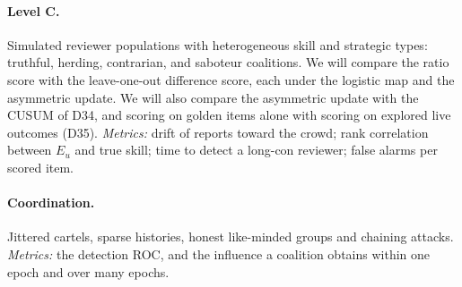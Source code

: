 \paragraph{Level C.}
Simulated reviewer populations with heterogeneous skill and strategic types: truthful, herding,
contrarian, and saboteur coalitions. We will compare the ratio score with the leave-one-out
difference score, each under the logistic map and the asymmetric update.
We will also compare the asymmetric update with the CUSUM of D34, and scoring on golden items
alone with scoring on explored live outcomes (D35).
\emph{Metrics:} drift of reports toward the crowd; rank correlation between $E_u$ and true
skill; time to detect a long-con reviewer; false alarms per scored item.

\paragraph{Coordination.}
Jittered cartels, sparse histories, honest like-minded groups and chaining attacks.
\emph{Metrics:} the detection ROC, and the influence a coalition obtains within one epoch and over
many epochs.

